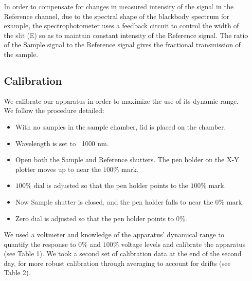 \documentclass{article}
\begin{document}
\hspace{.25cm}

In order to compensate for changes in measured intensity of the signal in the Reference channel, due to the spectral shape of the blackbody spectrum for example, the spectrophotometer uses a feedback circuit to control the width of the slit (E) so as to maintain constant intensity of the Reference signal. The ratio of the Sample signal to the Reference signal gives the fractional transmission of the sample.\cite{lab manual}

\subsection{Calibration}

We calibrate our apparatus in order to maximize the use of its dynamic range. We follow the procedure detailed:
\hspace{.25cm}
\begin{itemize}
\item With no samples in the sample chamber, lid is placed on the chamber.
\item Wavelength is set to ~1000 nm.
\item Open both the Sample and Reference shutters. The pen holder on the X-Y plotter moves up to near the $100\%$ mark.
\item $100\%$ dial is adjusted so that the pen holder points to the $100\%$ mark.
\item Now Sample shutter is closed, and the pen holder falls to near the $0\%$ mark.
\item Zero dial is adjusted so that the pen holder points to $0\%$.
\end{itemize}

\hspace{.25cm}

We used a voltmeter and knowledge of the apparatus' dynamical range to quantify the response to $0\%$ and $100\%$ voltage levels and calibrate the apparatus (see Table 1). We took a second set of calibration data at the end of the second day, for more robust calibration through averaging to account for drifts (see Table 2).
\end{document}

